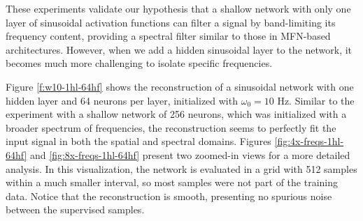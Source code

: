 These experiments validate our hypothesis that a shallow network with only one layer of sinusoidal activation functions can filter a signal by band-limiting its frequency content, providing a spectral filter similar to those in MFN-based architectures. However, when we add a hidden sinusoidal layer to the network, it becomes much more challenging to isolate specific frequencies. 

Figure \ref{f:w10-1hl-64hf} shows the reconstruction of a sinusoidal network with one hidden layer and 64 neurons per layer, initialized with $\omega_0=10$ Hz. Similar to the experiment with a shallow network of 256 neurons, which was initialized with a broader spectrum of frequencies, the reconstruction seems to perfectly fit the input signal in both the spatial and spectral domains. Figures \ref{fig:4x-freqs-1hl-64hf} and \ref{fig:8x-freqs-1hl-64hf} present two zoomed-in views for a more detailed analysis. In this visualization, the network is evaluated in a grid with 512 samples within a much smaller interval, so most samples were not part of the training data. Notice that the reconstruction is smooth, presenting no spurious noise between the supervised samples.


